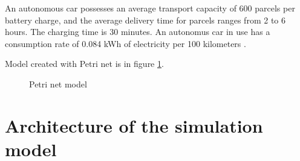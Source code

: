 \documentclass[a4paper, 11pt, a4paper]{article}
\begin{document}
An autonomous car possesses an average transport capacity of 600 parcels per battery charge, and the average delivery time for parcels ranges
from 2 to 6 hours. The charging time is 30 minutes. An autonomus car in use has a consumption rate of 0.084 kWh of electricity per 100 kilometers \cite{autonomous.emissions}.

Model created with Petri net is in figure \ref{figure:scheme}.

\begin{figure}[ht]
    \begin{center}
    \end{center}
    \caption{Petri net model}
    \label{figure:scheme}
\end{figure}


\section{Architecture of the simulation model}
\end{document}
